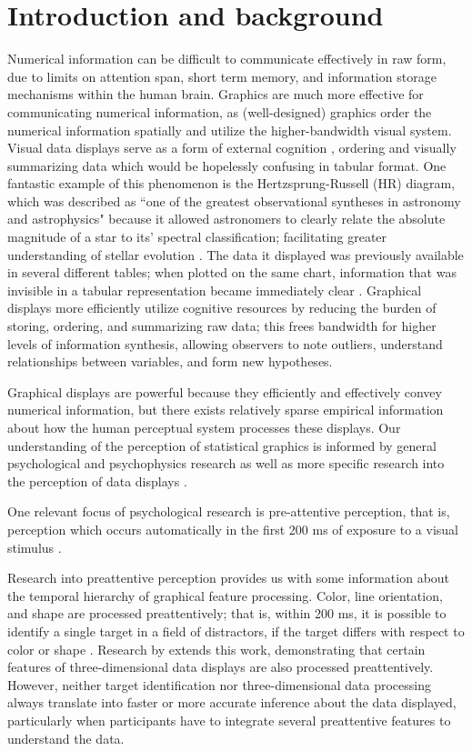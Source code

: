 \documentclass[11pt]{isuthesis}\usepackage[]{graphicx}\usepackage[]{color}
\begin{document}
\section{Introduction and background}
Numerical information can be difficult to communicate effectively in raw form, due to limits on attention span, short term memory, and information storage mechanisms within the human brain. 
Graphics are much more effective for communicating numerical information, as (well-designed) graphics order the numerical information spatially and utilize the higher-bandwidth visual system. 
Visual data displays serve as a form of external cognition \citep{zhang1997nature,scaife1996external}, ordering and visually summarizing data which would be hopelessly confusing in tabular format. 
One fantastic example of this phenomenon is the Hertzsprung-Russell (HR) diagram, which was described as ``one of the greatest observational syntheses in astronomy and astrophysics" because it allowed astronomers to clearly relate the absolute magnitude of a star to its' spectral classification; facilitating greater understanding of stellar evolution \citep{spence1993remarkable}. 
The data it displayed was previously available in several different tables; when plotted on the same chart, information that was invisible in a tabular representation became immediately clear \citep{lewandowsky1989perception}. 
Graphical displays more efficiently utilize cognitive resources by reducing the burden of storing, ordering, and summarizing raw data; this frees bandwidth for higher levels of information synthesis, allowing observers to note outliers, understand relationships between variables, and form new hypotheses.

Graphical displays are powerful because they efficiently and effectively convey numerical information, but there exists  relatively sparse empirical information about how the human perceptual system processes these displays. Our understanding of the perception of statistical graphics is informed by general psychological and psychophysics research as well as more specific research into the perception of data displays \citep{cleveland:1984}. 

One relevant focus of psychological research is pre-attentive perception, that is, perception which occurs automatically in the first 200 ms of exposure to a visual stimulus \citep{treisman1985preattentive}. 

Research into preattentive perception provides us with some information about the temporal hierarchy of graphical feature processing. Color, line orientation, and shape are processed preattentively; that is, within 200 ms, it is possible to identify a single target in a field of distractors, if the target differs with respect to color or shape \citep{goldstein2009encyclopedia}. 
Research by \citet{healey1999large} extends this work, demonstrating that certain features of three-dimensional data displays are also processed preattentively. However, neither target identification nor three-dimensional data processing always translate into faster or more accurate inference about the data displayed, particularly when participants have to integrate several preattentive features to understand the data. 
\end{document}
